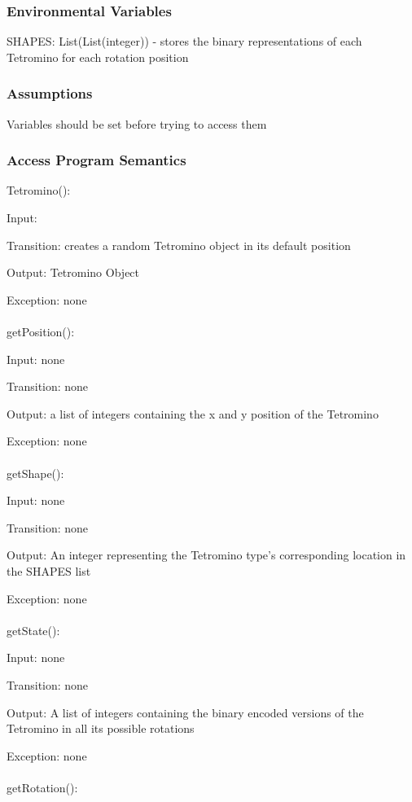 \documentclass[12,english]{article}
\begin{document}
			
			
			\subsubsection{Environmental Variables}
			SHAPES: List(List(integer)) - stores the binary representations of each Tetromino for each rotation position
			
			\subsubsection{Assumptions}
			Variables should be set before trying to access them
			
			\subsubsection{Access Program Semantics}
			
			Tetromino():
			
			Input: 
			
			Transition: creates a random Tetromino object in its default position
			
			Output: Tetromino Object
			
			Exception: none\\
			\\
			getPosition():
			
			Input: none
			
			Transition: none
			
			Output: a list of integers containing the x and y position of the Tetromino
			
			Exception: none\\
	        \\			
			getShape():
			
			Input: none
			
			Transition: none
			
			Output: An integer representing the Tetromino type's corresponding location in the SHAPES list
			
			Exception: none\\
			\\							
			getState():
			
			Input: none
			
			Transition: none
			
			Output: A list of integers containing the binary encoded versions of the Tetromino in all its possible rotations
			
			Exception: none\\
			\\		
			getRotation():
			
\end{document}
